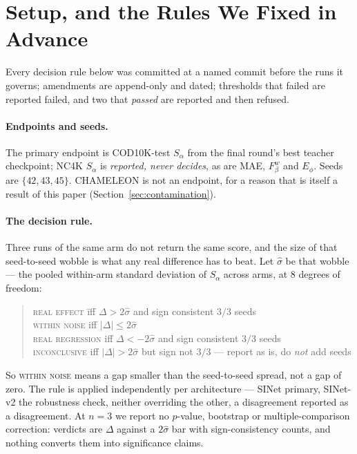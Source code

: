 \documentclass{article} %
\begin{document}
\section{Setup, and the Rules We Fixed in Advance}
\label{sec:setup}

Every decision rule below was committed at a named commit before the runs it governs; amendments are
append-only and dated; thresholds that failed are reported failed, and two that \emph{passed} are
reported and then refused.

\paragraph{Endpoints and seeds.} The primary endpoint is COD10K-test $S_\alpha$ from the final
round's best teacher checkpoint; NC4K $S_\alpha$ is \emph{reported, never decides}, as are MAE,
$F_\beta^w$ and $E_\phi$. Seeds are $\{42,43,45\}$. CHAMELEON is not an endpoint, for a reason that is
itself a result of this paper (Section~\ref{sec:contamination}).

\paragraph{The decision rule.} Three runs of the same arm do not return the same score, and the size
of that seed-to-seed wobble is what any real difference has to beat. Let $\hat{\sigma}$ be that
wobble --- the pooled within-arm standard deviation of $S_\alpha$ across arms, at $8$ degrees of
freedom:
\begin{quote}
\begin{tabbing}
\textsc{real effect} \quad\= iff $\Delta > 2\hat{\sigma}$ \; and sign consistent $3/3$ seeds \\
\textsc{within noise} \> iff $|\Delta| \leq 2\hat{\sigma}$ \\
\textsc{real regression} \> iff $\Delta < -2\hat{\sigma}$ \; and sign consistent $3/3$ seeds \\
\textsc{inconclusive} \> iff $|\Delta| > 2\hat{\sigma}$ but sign not $3/3$ --- report as is, do
\emph{not} add seeds
\end{tabbing}
\end{quote}
So \textsc{within noise} means a gap smaller than the seed-to-seed spread, not a gap of zero. The rule is applied independently per architecture --- SINet primary, SINet-v2 the robustness check,
neither overriding the other, a disagreement reported as a disagreement. At $n = 3$ we report no
$p$-value, bootstrap or multiple-comparison correction: verdicts are $\Delta$ against a
$2\hat{\sigma}$ bar with sign-consistency counts, and nothing converts them into significance
claims.
\end{document}
